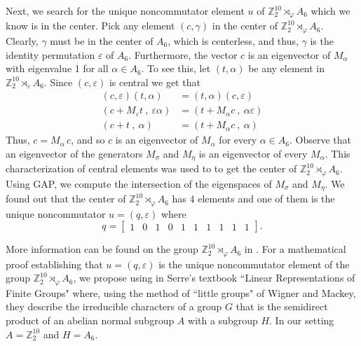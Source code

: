 \documentclass[11pt,twoside]{amsart}
\newcommand{\Z}{\mathbb{Z}}
\numberwithin{equation}{section}
\begin{document}
Next, we search for the unique noncommutator element $u$ of $\mathbb{Z}_2^{10} \rtimes_\varphi A_6$ which we know is in the center. Pick any element $(c, \gamma)$ in the center of $\Z_2^{10} \rtimes_\varphi A_6$. Clearly, $\gamma$ must be in the center of $A_6$, which is centerless, and thus, $\gamma$ is the identity permutation $\varepsilon$ of $A_6$. Furthermore, the vector $c$ is an eigenvector of $M_\alpha$ with eigenvalue 1 for all $\alpha \in A_6$. To see this, let $(t,\alpha)$ be any element in $\mathbb{Z}_2^{10} \rtimes_\varepsilon A_6$. Since $(c, \varepsilon)$ is central we get that
\begin{align*}
    (c, \varepsilon)(t, \alpha)&=(t, \alpha)(c, \varepsilon)\\
    (c+M_\varepsilon t\ , \ \varepsilon\alpha)&=(t+M_\alpha c\ , \ \alpha\varepsilon)\\
    (c+t\ , \ \alpha)&=(t+M_\alpha c\ , \ \alpha)
\end{align*}
Thus, $c=M_\alpha\, c$, and so $c$ is an eigenvector of $M_\alpha$ for every $\alpha\in A_6$. Observe that an eigenvector of the generators $M_\sigma$ and $M_\eta$ is an eigenvector of every $M_\alpha$.  This characterization of central elements was used to to get the center of $\mathbb{Z}_2^{10} \rtimes_\varphi A_6$. Using GAP, we compute the intersection of the eigenspaces of $M_\sigma$ and $M_\eta$. We found out that the center of $\Z_2^{10}\rtimes_\varphi A_6$ has 4 elements and one of them is the unique noncommutator $u=(q, \varepsilon)$ where  
\[
    q = 
    \begin{bmatrix}
        1 & 0 & 1 & 0 & 1 & 1 & 1 & 1 & 1 & 1
    \end{bmatrix}.
\]

More information can be found on the group $\mathbb{Z}_2^{10} \rtimes_\varphi A_6$ in \cite{holtplesken}. For a mathematical proof establishing that $u=(q,\varepsilon)$ is the unique noncommutator element of the group $\Z_2^{10}\rtimes_\varphi A_6$, we propose using \cite[Proposition 25]{Serre1977} in Serre's textbook ``Linear Representations of Finite Groups"  where, using the method of ``little groups" of Wigner and Mackey, they describe the irreducible characters of a group $G$ that is the semidirect product of an abelian normal subgroup $A$ with a subgroup $H$. In our setting $A=\Z_2^{10}$ and $H=A_6$.

\bigskip



\end{document}
